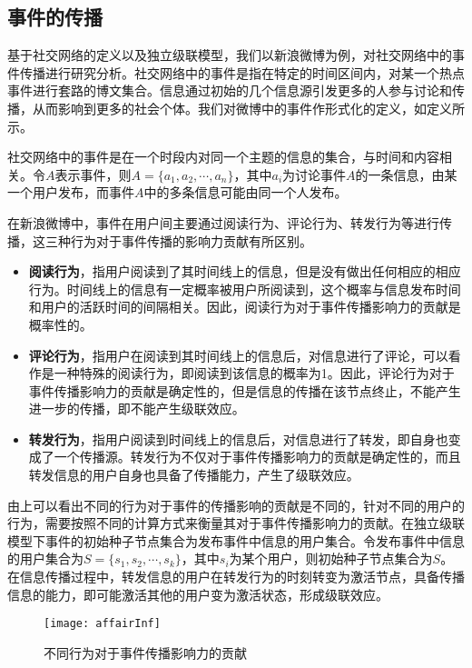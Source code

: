 \subsection{事件的传播}
\label{subsec5:affair}
基于社交网络的定义以及独立级联模型，我们以新浪微博为例，对社交网络中的事件传播进行研究分析。社交网络中的事件是指在特定的时间区间内，对某一个热点事件进行套路的博文集合。信息通过初始的几个信息源引发更多的人参与讨论和传播，从而影响到更多的社会个体。我们对微博中的事件作形式化的定义，如定义所示。

\begin{definition}[事件]
\label{def:event}
社交网络中的事件是在一个时段内对同一个主题的信息的集合，与时间和内容相关。令$A$表示事件，则$A=\{a_1, a_2, \cdots, a_n\}$，其中$a_i$为讨论事件$A$的一条信息，由某一个用户发布，而事件$A$中的多条信息可能由同一个人发布。
\end{definition}

在新浪微博中，事件在用户间主要通过阅读行为、评论行为、转发行为等进行传播，这三种行为对于事件传播的影响力贡献有所区别。
\begin{itemize}
  \item \textbf{阅读行为}，指用户阅读到了其时间线上的信息，但是没有做出任何相应的相应行为。时间线上的信息有一定概率被用户所阅读到，这个概率与信息发布时间和用户的活跃时间的间隔相关。因此，阅读行为对于事件传播影响力的贡献是概率性的。
  \item \textbf{评论行为}，指用户在阅读到其时间线上的信息后，对信息进行了评论，可以看作是一种特殊的阅读行为，即阅读到该信息的概率为1。因此，评论行为对于事件传播影响力的贡献是确定性的，但是信息的传播在该节点终止，不能产生进一步的传播，即不能产生级联效应。
  \item \textbf{转发行为}，指用户阅读到时间线上的信息后，对信息进行了转发，即自身也变成了一个传播源。转发行为不仅对于事件传播影响力的贡献是确定性的，而且转发信息的用户自身也具备了传播能力，产生了级联效应。
\end{itemize}

由上可以看出不同的行为对于事件的传播影响的贡献是不同的，针对不同的用户的行为，需要按照不同的计算方式来衡量其对于事件传播影响力的贡献。在独立级联模型下事件的初始种子节点集合为发布事件中信息的用户集合。令发布事件中信息的用户集合为$S=\{s_1,s_2,\cdots,s_k\}$，其中$s_i$为某个用户，则初始种子节点集合为$S$。在信息传播过程中，转发信息的用户在转发行为的时刻转变为激活节点，具备传播信息的能力，即可能激活其他的用户变为激活状态，形成级联效应。

\begin{figure}[!ht]
    \centering
    \texttt{[image: affairInf]}
    \caption{不同行为对于事件传播影响力的贡献}
    \label{fig:affairInf}
\end{figure}

